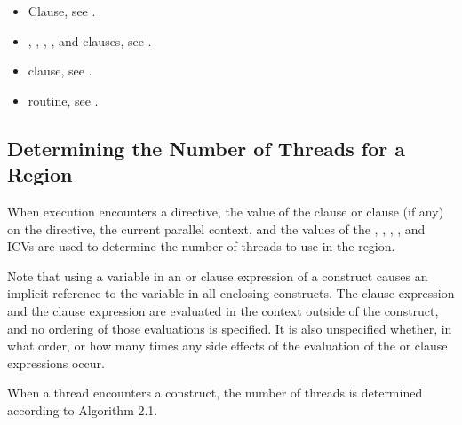 \crossreferences
\begin{itemize}
\item {} Clause, see .

\item {}, , , , and  clauses, see 
.

\item {} clause, see 
.

\item {} routine, see 
.
\end{itemize}











\subsection{Determining the Number of Threads for a  Region}
\label{subsec:Determining the Number of Threads for a parallel Region}
When execution encounters a  directive, the value of the  clause or 
 clause (if any) on the directive, the current parallel context, and the 
values of the , , , 
, and  
ICVs are used to determine the number of threads to use in the region.

Note that using a variable in an  or  clause expression of a 
 construct causes an implicit reference to the variable in all enclosing 
constructs. The  clause expression and the  clause expression are 
evaluated in the context outside of the  construct, and no ordering of those 
evaluations is specified. It is also unspecified whether, in what order, or how many times 
any side effects of the evaluation of the  or  clause expressions occur.

When a thread encounters a  construct, the number of threads is determined 
according to Algorithm 2.1.

